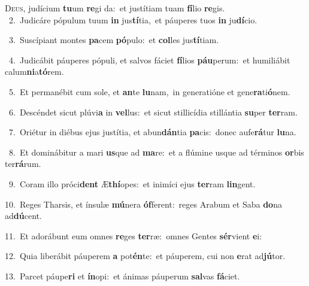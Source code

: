 \lettrine{\initial\textcolor{\initialcolor}{D}}{eus,} judícium \textbf{tu}\-um \textbf{re}\-gi da:~\star et justítiam tuam \textbf{fí}\-lio \textbf{re}\-gis.\\
{\numbfont\textcolor{\numbcolor}{~2.}}~Judicáre pópulum tuum \textbf{in} jus\-\textbf{tí}\-tia,~\star et páuperes tuos \textbf{in} ju\-\textbf{dí}\-cio.\par
{\numbfont\textcolor{\numbcolor}{~3.}}~Suscípiant montes \textbf{pa}\-cem \textbf{pó}\-pulo:~\star et \textbf{col}\-les jus\-\textbf{tí}\-tiam.\par
{\numbfont\textcolor{\numbcolor}{~4.}}~Judicábit páuperes pópuli, et salvos fáciet \textbf{fí}\-lios \textbf{páu}\-perum:~\star et humiliábit calum\-\textbf{ni}\-a\-\textbf{tó}\-rem.\par
{\numbfont\textcolor{\numbcolor}{~5.}}~Et permanébit cum sole, et \textbf{an}\-te \textbf{lu}\-nam,~\star in generatióne et gene\-\textbf{ra}\-ti\-\textbf{ó}\-nem.\par
{\numbfont\textcolor{\numbcolor}{~6.}}~Descéndet sicut plúvi\textbf{a} in \textbf{vel}\-lus:~\star et sicut stillicídia stillántia \textbf{su}\-per \textbf{ter}\-ram.\par
{\numbfont\textcolor{\numbcolor}{~7.}}~Oriétur in diébus ejus justítia, et abun\-\textbf{dán}\-tia \textbf{pa}\-cis:~\star donec aufe\-\textbf{rá}\-tur \textbf{lu}\-na.\par
{\numbfont\textcolor{\numbcolor}{~8.}}~Et dominábitur a mari \textbf{us}\-que ad \textbf{ma}\-re:~\star et a flúmine usque ad términos \textbf{or}\-bis ter\-\textbf{rá}\-rum.\par
{\numbfont\textcolor{\numbcolor}{~9.}}~Coram illo próci\textbf{dent} Æ\-\textbf{thí}\-opes:~\star et inimíci ejus \textbf{ter}\-ram \textbf{lin}\-gent.\par
{\numbfont\textcolor{\numbcolor}{10.}}~Reges Tharsis, et ínsulæ \textbf{mú}\-nera \textbf{óf}\-ferent:~\star reges Arabum et Saba \textbf{do}\-na ad\-\textbf{dú}\-cent.\par
{\numbfont\textcolor{\numbcolor}{11.}}~Et adorábunt eum omnes \textbf{re}\-ges \textbf{ter}\-ræ:~\star omnes Gentes \textbf{sér}\-vient \textbf{e}\-i:\par
{\numbfont\textcolor{\numbcolor}{12.}}~Quia liberábit páuperem \textbf{a} pot\-\textbf{én}\-te:~\star et páuperem, cui non \textbf{e}\-rat ad\-\textbf{jú}\-tor.\par
{\numbfont\textcolor{\numbcolor}{13.}}~Parcet páupe\textbf{ri} et \textbf{ín}\-opi:~\star et ánimas páuperum \textbf{sal}\-vas \textbf{fá}\-ciet.\par
